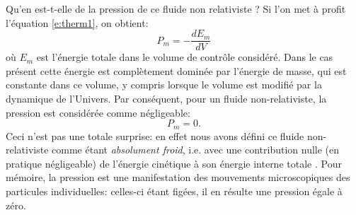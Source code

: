 Qu'en est-t-elle de la pression de ce fluide non relativiste ? Si l'on met à profit l'équation \ref{e:therm1}, on obtient:
\begin{equation}
P_m=-\frac{dE_m}{dV}
\end{equation}
où $E_m$ est l'énergie totale dans le volume de contrôle considéré. Dans le cas présent cette énergie est complètement dominée par l'énergie de masse, qui est constante dans ce volume, y compris lorsque le volume est modifié par la dynamique de l'Univers. Par conséquent, pour un fluide non-relativiste, la pression est considérée comme négligeable:
\begin{equation}
P_m=0.
\end{equation}
Ceci n'est pas une totale surprise: en effet nous avons défini ce fluide non-relativiste comme étant \textit{absolument froid}, i.e. avec une contribution nulle (en pratique négligeable) de l'énergie cinétique à son énergie interne totale . Pour mémoire, la pression est une manifestation des mouvements microscopiques des particules individuelles: celles-ci étant figées, il en résulte une pression égale à zéro.

